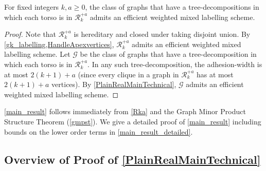 



\begin{cor}
  \label{Rka}
  For fixed integers $k,a\geq 0$, the class of graphs that have a tree-decompositions in which each torso is in $\mathcal{R}_k^{+a}$ admits an efficient weighted mixed labelling scheme.
\end{cor}

\begin{proof}
  Note that $\mathcal{R}_k^{+a}$ is hereditary and closed under taking disjoint union. By \cref{gk_labelling,HandleApexvertices}, $\mathcal{R}_k^{+a}$ admits an efficient weighted mixed labelling scheme.  Let $\mathcal{G}$ be the class of graphs that have a tree-decomposition in which each torso is in $\mathcal{R}_k^{+a}$. In any such tree-decomposition, the adhesion-width is at most $2(k+1)+a$ (since every clique in a graph in $\mathcal{R}_k^{+a}$ has at most $2(k+1)+a$ vertices). By \cref{PlainRealMainTechnical}, $\mathcal{G}$ admits an efficient weighted mixed labelling scheme.
\end{proof}

\cref{main_result} follows immediately from \cref{Rka} and the Graph Minor Product Structure Theorem (\cref{gmpst}). We give a detailed proof of \cref{main_result} including bounds on the lower order terms in \cref{main_result_detailed}.

\subsection{Overview of Proof of \cref{PlainRealMainTechnical}}
\label{Overview}






